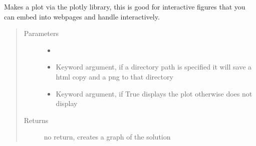 \documentclass[letterpaper,10pt,english]{sphinxmanual}
\begin{document}
\begin{fulllineitems}
\label{\detokenize{ppopt:ppopt.plot.plotly_plot}}
\sphinxAtStartPar
Makes a plot via the plotly library, this is good for interactive figures that you can embed into webpages and handle interactively.
\begin{quote}\begin{description}
\item[{Parameters}] \leavevmode\begin{itemize}
\item {} 
\sphinxAtStartPar
{} \textendash{} 

\item {} 
\sphinxAtStartPar
{} \textendash{} Keyword argument, if a directory path is specified it will save a html copy and a png to that directory

\item {} 
\sphinxAtStartPar
{} \textendash{} Keyword argument, if True displays the plot otherwise does not display

\end{itemize}

\item[{Returns}] \leavevmode
\sphinxAtStartPar
no return, creates a graph of the solution

\end{description}\end{quote}

\end{fulllineitems}

\end{document}
